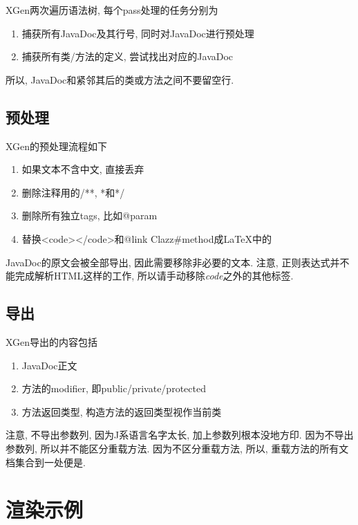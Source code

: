 XGen两次遍历语法树, 每个pass处理的任务分别为
\begin{centering}
    \begin{enumerate}
        \item 捕获所有JavaDoc及其行号, 同时对JavaDoc进行预处理
        \item 捕获所有类/方法的定义, 尝试找出对应的JavaDoc
    \end{enumerate}
\end{centering}

所以, JavaDoc和紧邻其后的类或方法之间不要留空行.

\section{预处理}

XGen的预处理流程如下

\begin{centering}
    \begin{enumerate}
        \item 如果文本不含中文, 直接丢弃
        \item 删除注释用的/**, *和*/
        \item 删除所有独立tags, 比如@param
        \item 替换<code></code>和{@link Clazz{\#}method}成LaTeX中的\emph{}
    \end{enumerate}
\end{centering}

JavaDoc的原文会被全部导出, 因此需要移除非必要的文本.
注意, 正则表达式并不能完成解析HTML这样的工作, 所以请手动移除\emph{code}之外的其他标签.

\section{导出}

XGen导出的内容包括

\begin{centering}
    \begin{enumerate}
        \item JavaDoc正文
        \item 方法的modifier, 即public/private/protected
        \item 方法返回类型, 构造方法的返回类型视作当前类
    \end{enumerate}
\end{centering}

注意, 不导出参数列, 因为J系语言名字太长, 加上参数列根本没地方印.
因为不导出参数列, 所以并不能区分重载方法.
因为不区分重载方法, 所以, 重载方法的所有文档集合到一处便是.

\chapter{渲染示例}
\label{ch:demo}


